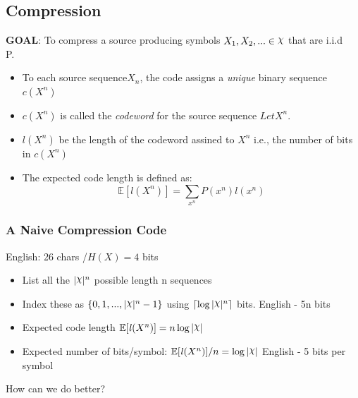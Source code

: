\documentclass[24pt]{article}
\DeclareRobustCommand{\rchi}{{\mathpalette\irchi\relax}}
\newcommand{\irchi}[2]{\raisebox{\depth}{$#1\chi$}} %
\begin{document}
\subsection{Compression}
\textbf{GOAL}: To compress a source producing symbols $X_1,X_2,... \in \rchi$ that are i.i.d ~ P.
\begin{itemize}
\item To each source sequence$X_n$, the code assigns a \textit{unique} binary sequence $c(X^n)$
\item $c(X^n)$ is called the \textit{codeword} for the source sequence $Let X^n$.
\item $\mathit{l}(X^n) $ be the length of the codeword assined to $X^n$ i.e., the number of bits in $c(X^n)$
\item The expected code length is defined as:
$$\mathbb{E}[\mathit{l}(X^n)] = \sum_{x^n}P(x^n)\mathit{l}(x^n)$$
\end{itemize}
\subsubsection{A Naive Compression Code}
English: 26 chars /$ H(X) = 4$ bits
\begin{itemize}
\item List all the $|\rchi|^n$ possible length n sequences 
\item Index these as $\{0,1,...,|\rchi|^n -1 \}$ using $\lceil \log |\rchi|^n \rceil$ bits. English - 5n bits 
\item Expected code length $\mathbb{E}[\mathit{l}(X^n)] = n \log |\rchi|$
\item Expected number of bits/symbol: $\mathbb{E}[\mathit{l}(X^n)] / n = \log |\rchi|$ English - 5 bits per symbol 
\end{itemize}

How can we do better?
\end{document}
